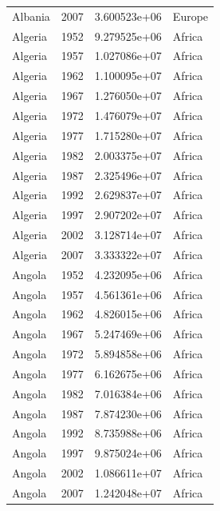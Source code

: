 \documentclass[
  letterpaper,
  DIV=11,
  numbers=noendperiod]{scrreprt}
\begin{document}
\begin{tcolorbox}
\begin{tabular}{lrrl}
Albania                  &  2007 &  3.600523e+06 &    Europe \\
Algeria                  &  1952 &  9.279525e+06 &    Africa \\
Algeria                  &  1957 &  1.027086e+07 &    Africa \\
Algeria                  &  1962 &  1.100095e+07 &    Africa \\
Algeria                  &  1967 &  1.276050e+07 &    Africa \\
Algeria                  &  1972 &  1.476079e+07 &    Africa \\
Algeria                  &  1977 &  1.715280e+07 &    Africa \\
Algeria                  &  1982 &  2.003375e+07 &    Africa \\
Algeria                  &  1987 &  2.325496e+07 &    Africa \\
Algeria                  &  1992 &  2.629837e+07 &    Africa \\
Algeria                  &  1997 &  2.907202e+07 &    Africa \\
Algeria                  &  2002 &  3.128714e+07 &    Africa \\
Algeria                  &  2007 &  3.333322e+07 &    Africa \\
Angola                   &  1952 &  4.232095e+06 &    Africa \\
Angola                   &  1957 &  4.561361e+06 &    Africa \\
Angola                   &  1962 &  4.826015e+06 &    Africa \\
Angola                   &  1967 &  5.247469e+06 &    Africa \\
Angola                   &  1972 &  5.894858e+06 &    Africa \\
Angola                   &  1977 &  6.162675e+06 &    Africa \\
Angola                   &  1982 &  7.016384e+06 &    Africa \\
Angola                   &  1987 &  7.874230e+06 &    Africa \\
Angola                   &  1992 &  8.735988e+06 &    Africa \\
Angola                   &  1997 &  9.875024e+06 &    Africa \\
Angola                   &  2002 &  1.086611e+07 &    Africa \\
Angola                   &  2007 &  1.242048e+07 &    Africa \\

\end{tabular}
\end{tcolorbox}
\end{document}
